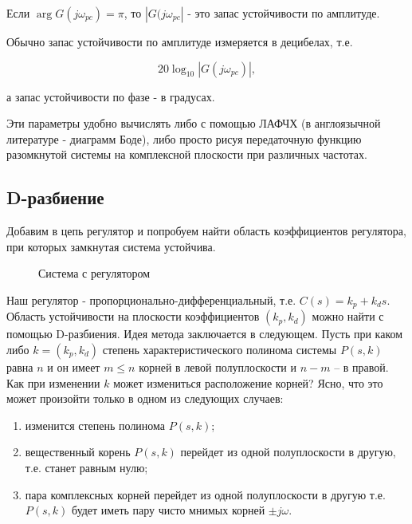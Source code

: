 \documentclass[12pt,a4paper]{article}
\begin{document}
Если $\arg G(j\omega_{pc}) = \pi$, то $|G(j\omega_{pc}|$ - это запас устойчивости по амплитуде.

Обычно запас устойчивости по амплитуде измеряется в децибелах, т.е.

$$ 20 \log_{10} |G(j\omega_{pc})|, $$

а запас устойчивости по фазе - в градусах.

Эти параметры удобно вычислять либо с помощью ЛАФЧХ (в англоязычной литературе - диаграмм Боде), либо просто рисуя передаточную функцию разомкнутой системы на комплексной плоскости при различных частотах.

\subsection{D-разбиение}

Добавим в цепь регулятор и попробуем найти область коэффициентов регулятора, при которых замкнутая система устойчива.

\begin{figure}
	\caption{Система с регулятором}
\end{figure}

Наш регулятор - пропорционально-дифференциальный, т.е. $C(s) = k_p + k_d s$. Область устойчивости на плоскости коэффициентов $(k_p, k_d)$ можно найти с помощью D-разбиения. Идея метода заключается в следующем. Пусть при каком либо $k = (k_p, k_d)$ степень характеристического полинома системы $P(s,k)$равна $n$ и он имеет $m \le n$ корней в левой полуплоскости и $n - m$ -- в правой. Как при изменении $k$ может измениться расположение корней? Ясно, что это может произойти только в одном из следующих случаев:

\begin{enumerate}
	\item изменится степень полинома $P(s,k)$;
	\item вещественный корень $P(s,k)$ перейдет из одной полуплоскости в другую, т.е. станет равным нулю;
	\item пара комплексных корней перейдет из одной полуплоскости в другую т.е. $P(s,k)$ будет иметь пару чисто мнимых корней $\pm j\omega$.
\end{enumerate}
\end{document}
